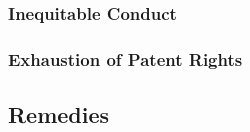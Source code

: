 \subsubsection{Inequitable Conduct}


\subsubsection{Exhaustion of Patent Rights}



\subsection{Remedies}


